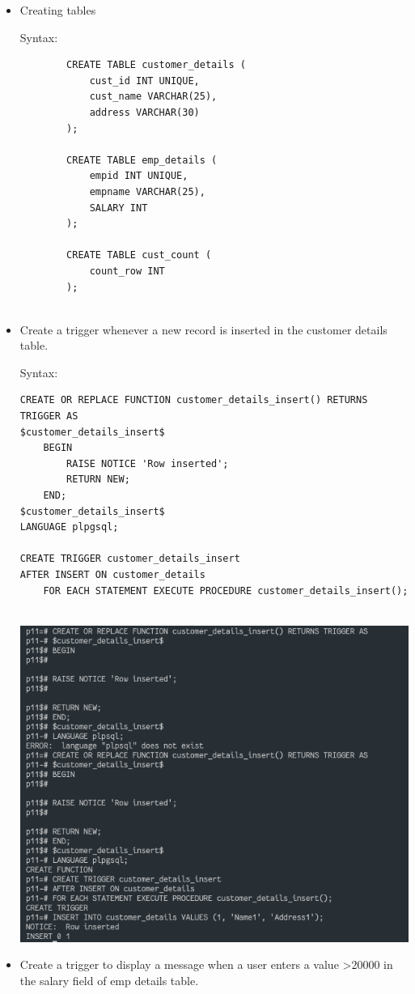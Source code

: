 \documentclass[13pt,oneside]{book}
\begin{document}
\begin{itemize}
	\item
	Creating tables
	 
	Syntax:
	\begin{verbatim}
		CREATE TABLE customer_details (
			cust_id INT UNIQUE,
			cust_name VARCHAR(25),
			address VARCHAR(30)
		);
		
		CREATE TABLE emp_details (
			empid INT UNIQUE,
			empname VARCHAR(25),
			SALARY INT
		);
		
		CREATE TABLE cust_count (
			count_row INT
		);
	
	\end{verbatim}
	
	
	\item
	Create a trigger whenever a new record is inserted in the customer details
	table.

	Syntax:
	\begin{verbatim}
CREATE OR REPLACE FUNCTION customer_details_insert() RETURNS TRIGGER AS
$customer_details_insert$
	BEGIN
		RAISE NOTICE 'Row inserted';
		RETURN NEW;
	END;
$customer_details_insert$
LANGUAGE plpgsql;

CREATE TRIGGER customer_details_insert
AFTER INSERT ON customer_details
	FOR EACH STATEMENT EXECUTE PROCEDURE customer_details_insert();
	
	\end{verbatim}
	\includegraphics[]{img/p10/ss1.png}
	
	
	\item
	Create a trigger to display a message when a user enters a value >20000
	in the salary field of emp details table.
	 

\end{itemize}
\end{document}
